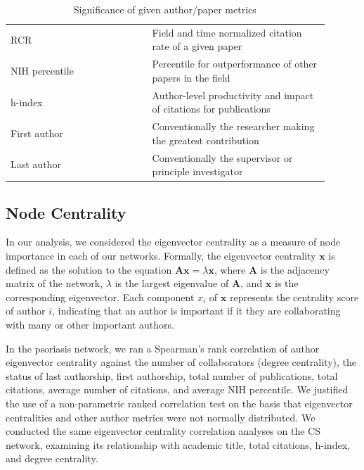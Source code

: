 \documentclass[9pt,twocolumn,twoside]{pnas-new}
\begin{document}
\begin{table}[H]
\centering
\caption{Significance of given author/paper metrics}
\begin{tabular}{>{\raggedright\arraybackslash}p{0.4\linewidth}>{\raggedright\arraybackslash}p{0.5\linewidth}}
\midrule
RCR&  Field and time normalized citation rate of a given paper\\
NIH percentile& Percentile for outperformance of other papers in the field\\
h-index& Author-level productivity and impact of citations for publications\\
First author& Conventionally the researcher making the greatest contribution\\
Last author& Conventionally the supervisor or principle investigator\\
\end{tabular}

\end{table}

\subsection*{Node Centrality} 
In our analysis, we considered the eigenvector centrality as a measure of node importance in each of our networks. Formally, the eigenvector centrality \( \mathbf{x} \) is defined as the solution to the equation $\mathbf{A} \mathbf{x} = \lambda \mathbf{x}$, where \( \mathbf{A} \) is the adjacency matrix of the network, \( \lambda \) is the largest eigenvalue of \( \mathbf{A} \), and \( \mathbf{x} \) is the corresponding eigenvector. Each component \( x_i \) of \( \mathbf{x} \) represents the centrality score of author \( i \), indicating that an author is important if it they are collaborating with many or other important authors.
\newline

\noindent In the psoriasis network, we ran a Spearman's rank correlation of author eigenvector centrality against the number of collaborators (degree centrality), the status of last authorship, first authorship, total number of publications, total citations, average number of citations, and average NIH percentile. We justified the use of a non-parametric ranked correlation test on the basis that eigenvector centralities and other author metrics were not normally distributed. We conducted the same eigenvector centrality correlation analyses on the CS network, examining its relationship with academic title, total citations, h-index, and degree centrality. 
\end{document}
